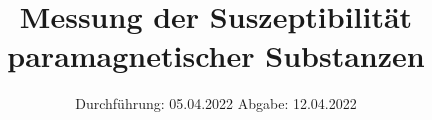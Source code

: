 

\subject{V 606}
\title{Messung der Suszeptibilität paramagnetischer Substanzen}
\date{%
  Durchführung: 05.04.2022
  \hspace{3em}
  Abgabe: 12.04.2022
}



\maketitle
\thispagestyle{empty}
\tableofcontents
\newpage









